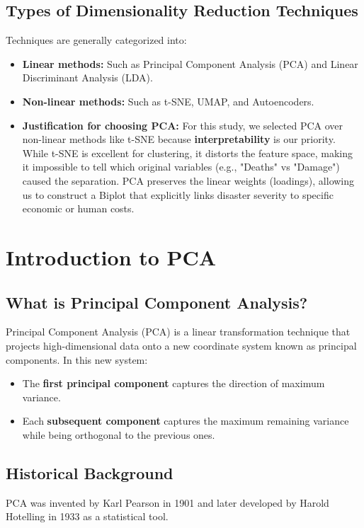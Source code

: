 \documentclass[12pt, a4paper]{report}
\begin{document}
\subsection{Types of Dimensionality Reduction Techniques}
Techniques are generally categorized into:
\begin{itemize}
    \item \textbf{Linear methods:} Such as Principal Component Analysis (PCA) and Linear Discriminant Analysis (LDA).
    \item \textbf{Non-linear methods:} Such as t-SNE, UMAP, and Autoencoders.
    \item \textbf{Justification for choosing PCA:} 
For this study, we selected PCA over non-linear methods like t-SNE because \textbf{interpretability} is our priority. While t-SNE is excellent for clustering, it distorts the feature space, making it impossible to tell which original variables (e.g., "Deaths" vs "Damage") caused the separation. PCA preserves the linear weights (loadings), allowing us to construct a Biplot that explicitly links disaster severity to specific economic or human costs.
\end{itemize}

\section{Introduction to PCA}

\subsection{What is Principal Component Analysis?}
Principal Component Analysis (PCA) is a linear transformation technique that projects high-dimensional data onto a new coordinate system known as principal components. In this new system:
\begin{itemize}
    \item The \textbf{first principal component} captures the direction of maximum variance.
    \item Each \textbf{subsequent component} captures the maximum remaining variance while being orthogonal to the previous ones.
\end{itemize}

\subsection{Historical Background}
PCA was invented by Karl Pearson in 1901 and later developed by Harold Hotelling in 1933 as a statistical tool.
\end{document}
